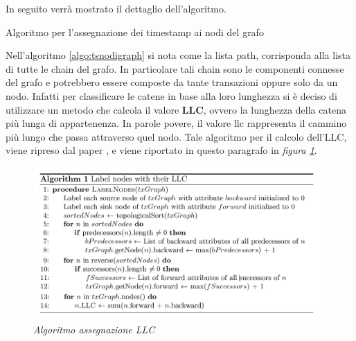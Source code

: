 In seguito verrà mostrato il dettaglio dell'algoritmo.
\\
\begin{algorithm}[h]
	\caption{Algoritmo per l'assegnazione dei timestamp ai nodi del grafo} \label{algo:tsnodigraph}

\end{algorithm}

Nell'algoritmo \ref{algo:tsnodigraph} si nota come la lista path, corrisponda alla lista di tutte le chain del grafo. In particolare tali chain sono le componenti connesse del grafo e potrebbero essere composte da tante transazioni oppure solo da un nodo. Infatti per classificare le catene in base alla loro lunghezza si è deciso di utilizzare un metodo che calcola il valore \textbf{LLC}, ovvero la lunghezza della catena più lunga di appartenenza. In parole povere, il valore llc rappresenta il cammino più lungo che passa attraverso quel nodo.
Tale algoritmo per il calcolo dell'LLC, viene ripreso dal paper \cite{ddp-ltcbh-17}, e viene riportato in questo paragrafo in \textit{figura \ref{fig:llcalgo}}.
\\
\begin{figure}[htbp]
	\centering
	\includegraphics[width = \linewidth]{figure/llcalgo}
	\caption{\textit{Algoritmo assegnazione LLC} \cite{ddp-ltcbh-17} \label{fig:llcalgo}}
\end{figure}

